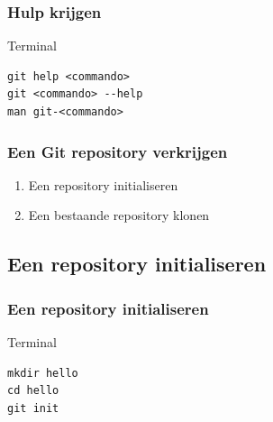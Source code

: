\documentclass[]{beamer}
\begin{document}
\begin{frame}[fragile]
    \frametitle{Hulp krijgen}

    \begin{block}{Terminal}
\begin{verbatim}
git help <commando>
git <commando> --help
man git-<commando>
\end{verbatim}
    \end{block}
\end{frame}

\begin{frame}
    \frametitle{Een Git repository verkrijgen}

    \begin{enumerate}
        \item Een repository initialiseren
        \item Een bestaande repository klonen
    \end{enumerate}
\end{frame}

\subsection{Een repository initialiseren}

\begin{frame}[fragile]
    \frametitle{Een repository initialiseren}

    \begin{block}{Terminal}
\begin{verbatim}
mkdir hello
cd hello
git init
\end{verbatim}
    \end{block}
\end{frame}

\end{document}

